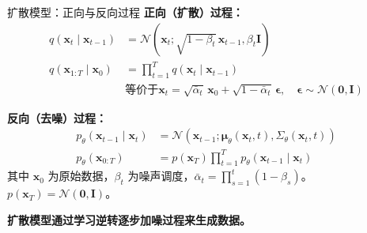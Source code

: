 \begin{refsection}
\begin{frame}{扩散模型：正向与反向过程}
  \footnotesize
  \textbf{正向（扩散）过程：}
  \begin{align*}
    q(\mathbf{x}_t \mid \mathbf{x}_{t-1}) &= \mathcal{N}(\mathbf{x}_t; \sqrt{1-\beta_t}\,\mathbf{x}_{t-1}, \beta_t \mathbf{I}) \\
    q(\mathbf{x}_{1:T} \mid \mathbf{x}_0) &= \prod_{t=1}^T q(\mathbf{x}_t \mid \mathbf{x}_{t-1}) \\
    &\text{等价于} 
    \mathbf{x}_t = \sqrt{\bar{\alpha}_t}\,\mathbf{x}_0 + \sqrt{1-\bar{\alpha}_t}\,\boldsymbol{\epsilon}, \quad \boldsymbol{\epsilon} \sim \mathcal{N}(\mathbf{0}, \mathbf{I})
  \end{align*}

  \footnotesize
  \textbf{反向（去噪）过程：}
  \begin{align*}
    p_\theta(\mathbf{x}_{t-1} \mid \mathbf{x}_t) &= \mathcal{N}(\mathbf{x}_{t-1}; \boldsymbol{\mu}_\theta(\mathbf{x}_t, t), \Sigma_\theta(\mathbf{x}_t, t)) \\
    p_\theta(\mathbf{x}_{0:T}) &= p(\mathbf{x}_T) \prod_{t=1}^T p_\theta(\mathbf{x}_{t-1} \mid \mathbf{x}_t)
  \end{align*}
  \scriptsize
  其中 $\mathbf{x}_0$ 为原始数据，$\beta_t$ 为噪声调度，$\bar{\alpha}_t = \prod_{s=1}^t (1-\beta_s)$。$p(\mathbf{x}_T) = \mathcal{N}(\mathbf{0}, \mathbf{I})$。

  \scriptsize
  \textbf{扩散模型通过学习逆转逐步加噪过程来生成数据。}~\parencite{sohl2015deep,ho2020denoising}
  \bottomleftrefs
\end{frame}
\end{refsection}

